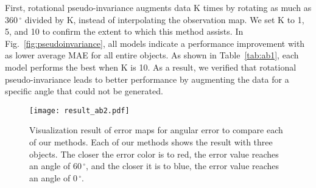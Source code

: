 \documentclass[preprint,12pt,authoryear]{elsarticle}
\begin{document}
First, rotational pseudo-invariance augments data K times by rotating as much as $360\,^{\circ}$ divided by K, instead of interpolating the observation map. We set K to 1, 5, and 10 to confirm the extent to which this method assists. In Fig.~\ref{fig:pseudoinvariance}, all models indicate a performance improvement with as lower average MAE for all entire objects. As shown in Table~\ref{tab:ab1}, each model performs the best when K is 10. As a result, we verified that rotational pseudo-invariance leads to better performance by augmenting the data for a specific angle that could not be generated.

\begin{figure}[t]
    \centering
    \texttt{[image: result\_ab2.pdf]}
    \caption{Visualization result of error maps for angular error to compare each of our methods. Each of our methods shows the result with three objects. The closer the error color is to red, the error value reaches an angle of $60\,^{\circ}$, and the closer it is to blue, the error value reaches an angle of $0\,^{\circ}$.}
    \label{fig:ab2result}
\end{figure}
\begin{table*}[!h]%
\caption{Results of our methods on the RGB event pair test dataset. The bold values are the best values in terms of performance. The w/o $O_{e}$ indicates that $O_{e}$ are not contained as input, while w $O_{e}$ indicates that $O_{e}$ are included as input.}
\label{tab:ab2}
\end{table*}
\end{document}
